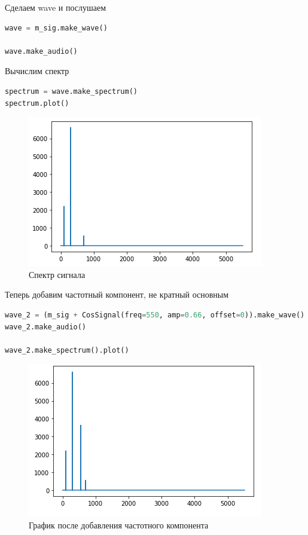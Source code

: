 Сделаем wave и послушаем
\begin{lstlisting}[language=Python]
wave = m_sig.make_wave()

wave.make_audio()
\end{lstlisting}

Вычислим спектр
\begin{lstlisting}[language=Python]
spectrum = wave.make_spectrum()
spectrum.plot()
\end{lstlisting}

\begin{figure}[H]
	\begin{center}
		\includegraphics[scale=1]{fig/lab01/lab01_09.png}
		\caption{Спектр сигнала}
	\end{center}
\end{figure}

Теперь добавим частотный компонент, не кратный основным
\begin{lstlisting}[language=Python]
wave_2 = (m_sig + CosSignal(freq=550, amp=0.66, offset=0)).make_wave()
wave_2.make_audio()

wave_2.make_spectrum().plot()
\end{lstlisting}

\begin{figure}[H]
	\begin{center}
		\includegraphics[scale=1]{fig/lab01/lab01_10.png}
		\caption{График после добавления частотного компонента}
	\end{center}
\end{figure}

